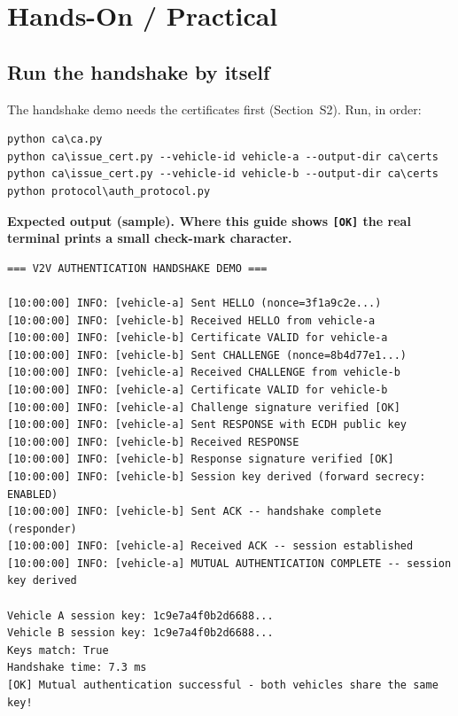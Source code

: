 \documentclass[11pt,a4paper]{article}
\begin{document}
\section{Hands-On / Practical}

\subsection{Run the handshake by itself}
The handshake demo needs the certificates first (Section~S2). Run, in order:
\begin{lstlisting}[style=term]
python ca\ca.py
python ca\issue_cert.py --vehicle-id vehicle-a --output-dir ca\certs
python ca\issue_cert.py --vehicle-id vehicle-b --output-dir ca\certs
python protocol\auth_protocol.py
\end{lstlisting}

\noindent\textbf{Expected output (sample). Where this guide shows \texttt{[OK]}
the real terminal prints a small check-mark character.}
\begin{lstlisting}[style=term]
=== V2V AUTHENTICATION HANDSHAKE DEMO ===

[10:00:00] INFO: [vehicle-a] Sent HELLO (nonce=3f1a9c2e...)
[10:00:00] INFO: [vehicle-b] Received HELLO from vehicle-a
[10:00:00] INFO: [vehicle-b] Certificate VALID for vehicle-a
[10:00:00] INFO: [vehicle-b] Sent CHALLENGE (nonce=8b4d77e1...)
[10:00:00] INFO: [vehicle-a] Received CHALLENGE from vehicle-b
[10:00:00] INFO: [vehicle-a] Certificate VALID for vehicle-b
[10:00:00] INFO: [vehicle-a] Challenge signature verified [OK]
[10:00:00] INFO: [vehicle-a] Sent RESPONSE with ECDH public key
[10:00:00] INFO: [vehicle-b] Received RESPONSE
[10:00:00] INFO: [vehicle-b] Response signature verified [OK]
[10:00:00] INFO: [vehicle-b] Session key derived (forward secrecy: ENABLED)
[10:00:00] INFO: [vehicle-b] Sent ACK -- handshake complete (responder)
[10:00:00] INFO: [vehicle-a] Received ACK -- session established
[10:00:00] INFO: [vehicle-a] MUTUAL AUTHENTICATION COMPLETE -- session key derived

Vehicle A session key: 1c9e7a4f0b2d6688...
Vehicle B session key: 1c9e7a4f0b2d6688...
Keys match: True
Handshake time: 7.3 ms
[OK] Mutual authentication successful - both vehicles share the same key!
\end{lstlisting}
\end{document}
